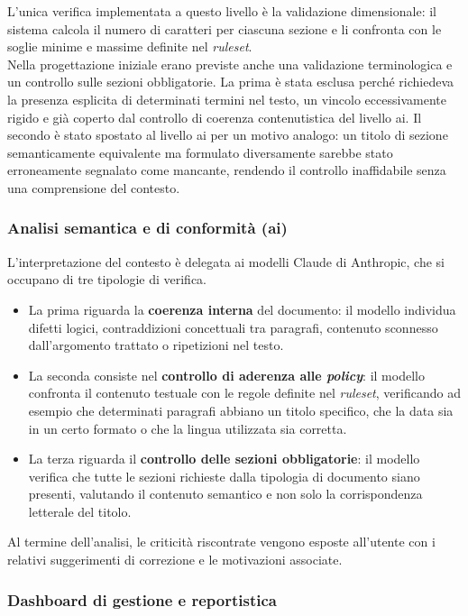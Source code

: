 L'unica verifica implementata a questo livello è la validazione dimensionale: il sistema calcola il numero di caratteri per ciascuna sezione e li confronta con le soglie minime e massime definite nel \emph{ruleset}.\\

Nella progettazione iniziale erano previste anche una validazione terminologica e un controllo sulle sezioni obbligatorie. La prima è stata esclusa perché richiedeva la presenza esplicita di determinati termini nel testo, un vincolo eccessivamente rigido e già coperto dal controllo di coerenza contenutistica del livello ai. Il secondo è stato spostato al livello ai per un motivo analogo: un titolo di sezione semanticamente equivalente ma formulato diversamente sarebbe stato erroneamente segnalato come mancante, rendendo il controllo inaffidabile senza una comprensione del contesto.


\subsubsection{Analisi semantica e di conformità (ai)}
L'interpretazione del contesto è delegata ai modelli Claude di Anthropic, che si occupano di tre tipologie di verifica.

\begin{itemize}
    \item La prima riguarda la \textbf{coerenza interna} del documento: il modello individua difetti logici, contraddizioni concettuali tra paragrafi, contenuto sconnesso dall'argomento trattato o ripetizioni nel testo.
    \item La seconda consiste nel \textbf{controllo di aderenza alle \emph{policy}}: il modello confronta il contenuto testuale con le regole definite nel \emph{ruleset}, verificando ad esempio che determinati paragrafi abbiano un titolo specifico, che la data sia in un certo formato o che la lingua utilizzata sia corretta.
    \item La terza riguarda il \textbf{controllo delle sezioni obbligatorie}: il modello verifica che tutte le sezioni richieste dalla tipologia di documento siano presenti, valutando il contenuto semantico e non solo la corrispondenza letterale del titolo.
\end{itemize}

Al termine dell'analisi, le criticità riscontrate vengono esposte all'utente con i relativi suggerimenti di correzione e le motivazioni associate.


\subsubsection{Dashboard di gestione e reportistica}

